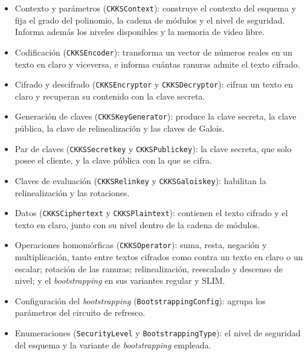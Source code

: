 \begin{itemize}
    \item Contexto y parámetros (\texttt{CKKSContext}): construye el contexto del esquema y fija el grado del polinomio, la cadena de módulos y el nivel de seguridad. Informa además los niveles disponibles y la memoria de video libre.

    \item Codificación (\texttt{CKKSEncoder}): transforma un vector de números reales en un texto en claro y viceversa, e informa cuántas ranuras admite el texto cifrado.

    \item Cifrado y descifrado (\texttt{CKKSEncryptor} y \texttt{CKKSDecryptor}): cifran un texto en claro y recuperan su contenido con la clave secreta.

    \item Generación de claves (\texttt{CKKSKeyGenerator}): produce la clave secreta, la clave pública, la clave de relinealización y las claves de Galois.

    \item Par de claves (\texttt{CKKSSecretkey} y \texttt{CKKSPublickey}): la clave secreta, que solo posee el cliente, y la clave pública con la que se cifra.

    \item Claves de evaluación (\texttt{CKKSRelinkey} y \texttt{CKKSGaloiskey}): habilitan la relinealización y las rotaciones.

    \item Datos (\texttt{CKKSCiphertext} y \texttt{CKKSPlaintext}): contienen el texto cifrado y el texto en claro, junto con su nivel dentro de la cadena de módulos.

    \item Operaciones homomórficas (\texttt{CKKSOperator}): suma, resta, negación y multiplicación, tanto entre textos cifrados como contra un texto en claro o un escalar; rotación de las ranuras; relinealización, reescalado y descenso de nivel; y el \textit{bootstrapping} en sus variantes regular y SLIM.

    \item Configuración del \textit{bootstrapping} (\texttt{BootstrappingConfig}): agrupa los parámetros del circuito de refresco.

    \item Enumeraciones (\texttt{SecurityLevel} y \texttt{BootstrappingType}): el nivel de seguridad del esquema y la variante de \textit{bootstrapping} empleada.
\end{itemize}


